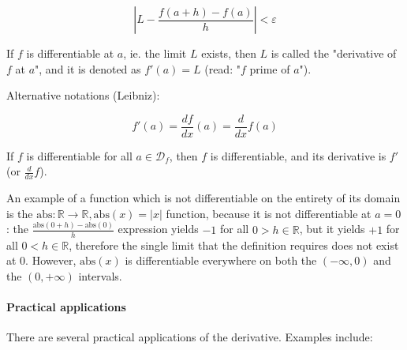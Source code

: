 \documentclass[titlepage]{article}
\begin{document}
          $$\left| L - \frac{f(a+h) - f(a)}{h} \right| < \varepsilon $$

          If $f$ is differentiable at $a$, ie. the limit $L$ exists, then $L$ is
          called the "derivative of $f$ at $a$", and it is denoted as
          $f'(a) = L$ (read: "$f$ prime of $a$").

          Alternative notations (Leibniz):

          $$f'(a) = \frac{df}{dx} (a) = \frac{d}{dx} f(a)$$

          If $f$ is differentiable for all $a \in \mathcal{D}_f$, then $f$ is
          differentiable, and its derivative is $f'$ (or $\frac{d}{dx} f$).

          An example of a function which is not differentiable on the entirety
          of its domain is the
          $\text{abs} : \mathbb{R} \rightarrow \mathbb{R}, \text{abs} (x) = |x|$
          function, because it is not differentiable at $a=0$: the
          $\frac{\text{abs}(0+h)-\text{abs}(0)}{h}$ expression yields $-1$ for
          all $0 > h \in \mathbb{R}$, but it yields $+1$ for all
          $0 < h \in \mathbb{R}$, therefore the single limit that the definition
          requires does not exist at $0$. However, $\text{abs}(x)$ is
          differentiable everywhere on both the $(-\infty, 0)$ and the $(0,
          +\infty)$ intervals.

          \paragraph{Practical applications}

            There are several practical applications of the derivative. Examples
            include:
\end{document}
